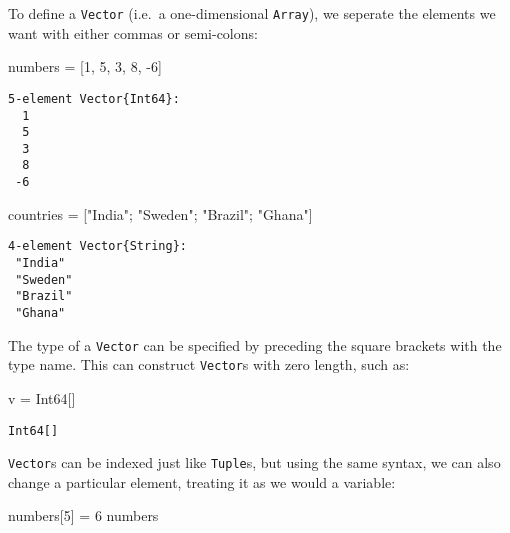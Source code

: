 \documentclass[
  letterpaper,
  DIV=11,
  numbers=noendperiod]{scrreprt}
\newenvironment{Shaded}{\begin{snugshade}}{\end{snugshade}}
\newcommand{\DataTypeTok}[1]{\textcolor[rgb]{0.68,0.00,0.00}{#1}}
\newcommand{\FloatTok}[1]{\textcolor[rgb]{0.68,0.00,0.00}{#1}}
\newcommand{\NormalTok}[1]{\textcolor[rgb]{0.00,0.23,0.31}{#1}}
\newcommand{\OperatorTok}[1]{\textcolor[rgb]{0.37,0.37,0.37}{#1}}
\newcommand{\StringTok}[1]{\textcolor[rgb]{0.13,0.47,0.30}{#1}}
\begin{document}
To define a \texttt{Vector} (i.e.~a one-dimensional \texttt{Array}), we
seperate the elements we want with either commas or semi-colons:

\begin{Shaded}
\begin{Highlighting}[]
\NormalTok{numbers }\OperatorTok{=}\NormalTok{ [}\FloatTok{1}\NormalTok{, }\FloatTok{5}\NormalTok{, }\FloatTok{3}\NormalTok{, }\FloatTok{8}\NormalTok{, }\OperatorTok{{-}}\FloatTok{6}\NormalTok{]}
\end{Highlighting}
\end{Shaded}

\begin{verbatim}
5-element Vector{Int64}:
  1
  5
  3
  8
 -6
\end{verbatim}

\begin{Shaded}
\begin{Highlighting}[]
\NormalTok{countries }\OperatorTok{=}\NormalTok{ [}\StringTok{"India"}\NormalTok{; }\StringTok{"Sweden"}\NormalTok{; }\StringTok{"Brazil"}\NormalTok{; }\StringTok{"Ghana"}\NormalTok{]}
\end{Highlighting}
\end{Shaded}

\begin{verbatim}
4-element Vector{String}:
 "India"
 "Sweden"
 "Brazil"
 "Ghana"
\end{verbatim}

The type of a \texttt{Vector} can be specified by preceding the square
brackets with the type name. This can construct \texttt{Vector}s with
zero length, such as:

\begin{Shaded}
\begin{Highlighting}[]
\NormalTok{v }\OperatorTok{=} \DataTypeTok{Int64}\NormalTok{[]}
\end{Highlighting}
\end{Shaded}

\begin{verbatim}
Int64[]
\end{verbatim}

\texttt{Vector}s can be indexed just like \texttt{Tuple}s, but using the
same syntax, we can also change a particular element, treating it as we
would a variable:

\begin{Shaded}
\begin{Highlighting}[]
\NormalTok{numbers[}\FloatTok{5}\NormalTok{] }\OperatorTok{=} \FloatTok{6}
\NormalTok{numbers}
\end{Highlighting}
\end{Shaded}
\end{document}
